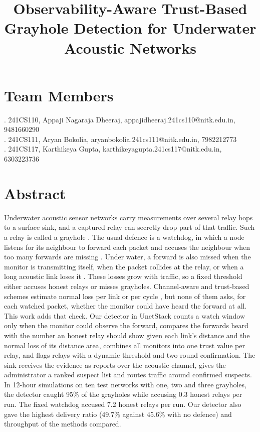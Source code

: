 \documentclass{article}
\title{\textbf{Observability-Aware Trust-Based Grayhole Detection for Underwater Acoustic Networks}}
\date{}
\begin{document}

\maketitle

\section*{Team Members}

. 241CS110, Appaji Nagaraja Dheeraj, appajidheeraj.241cs110@nitk.edu.in, 9481660290 \\
. 241CS111, Aryan Bokolia, aryanbokolia.241cs111@nitk.edu.in, 7982212773 \\
. 241CS117, Karthikeya Gupta, karthikeyagupta.241cs117@nitk.edu.in, 6303223736

\section*{Abstract}
\noindent
Underwater acoustic sensor networks carry measurements over several relay hops to a surface sink, and a captured relay can secretly drop part of that traffic. Such a relay is called a grayhole \cite{karlof2003,domingo2011}. The usual defence is a watchdog, in which a node listens for its neighbour to forward each packet and accuses the neighbour when too many forwards are missing \cite{marti2000}. Under water, a forward is also missed when the monitor is transmitting itself, when the packet collides at the relay, or when a long acoustic link loses it \cite{akyildiz2005}. These losses grow with traffic, so a fixed threshold either accuses honest relays or misses grayholes. Channel-aware and trust-based schemes estimate normal loss per link or per cycle \cite{shila2010,han2015,liu2024}, but none of them asks, for each watched packet, whether the monitor could have heard the forward at all. This work adds that check. Our detector in UnetStack \cite{chitre2014} counts a watch window only when the monitor could observe the forward, compares the forwards heard with the number an honest relay should show given each link's distance and the normal loss of its distance area, combines all monitors into one trust value per relay, and flags relays with a dynamic threshold and two-round confirmation. The sink receives the evidence as reports over the acoustic channel, gives the administrator a ranked suspect list and routes traffic around confirmed suspects. In 12-hour simulations on ten test networks with one, two and three grayholes, the detector caught 95\% of the grayholes while accusing 0.3 honest relays per run. The fixed watchdog accused 7.2 honest relays per run. Our detector also gave the highest delivery ratio (49.7\% against 45.6\% with no defence) and throughput of the methods compared.
\end{document}
